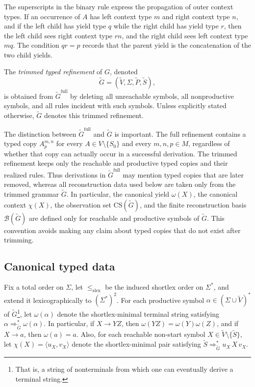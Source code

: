 \documentclass[11pt,a4paper]{article}
\newcommand{\CS}{\mathrm{CS}}
\begin{document}
The superscripts in the binary rule express the propagation of outer
context types. If an occurrence of $A$ has left context type $m$ and
right context type $n$, and if the left child has yield type $q$ while
the right child has yield type $r$, then the left child sees right
context type $rn$, and the right child sees left context type $mq$.
The condition $qr=p$ records that the parent yield is the concatenation
of the two child yields.

The \emph{trimmed typed refinement} of $G$, denoted
\[
  \widetilde G=(\widetilde V,\Sigma,\widetilde P,\widetilde S),
\]
is obtained from $\widetilde G^{\mathrm{full}}$ by deleting all
unreachable symbols, all nonproductive symbols, and all rules incident
with such symbols. Unless explicitly stated otherwise,
$\widetilde G$ denotes this trimmed refinement.

The distinction between
$\widetilde G^{\mathrm{full}}$ and $\widetilde G$ is important. The full
refinement contains a typed copy $A_p^{m,n}$ for every
$A\in V\setminus\{S_0\}$ and every $m,n,p\in M$, regardless of whether
that copy can actually occur in a successful derivation. The trimmed
refinement keeps only the reachable and productive typed copies and
their realized rules. Thus derivations in
$\widetilde G^{\mathrm{full}}$ may mention typed copies that are later
removed, whereas all reconstruction data used below are taken only from
the trimmed grammar $\widetilde G$. In particular, the canonical yield
$\omega(X)$, the canonical context $\chi(X)$, the observation set
$\CS(\widetilde G)$, and the finite reconstruction basis
$\mathcal B(\widetilde G)$ are defined only for reachable and productive
symbols of $\widetilde G$. This convention avoids making any claim about
typed copies that do not exist after trimming.

\subsection{Canonical typed data}

Fix a total order on $\Sigma$, let $\le_{\mathrm{slex}}$ be the induced
shortlex order on $\Sigma^*$, and extend it lexicographically to
$(\Sigma^*)^2$. For each productive symbol
$\alpha\in(\Sigma\cup\widetilde V)^*$ of $\widetilde G$\footnote{That
is, a string of nonterminals from which one can eventually derive a
terminal string.}, let $\omega(\alpha)$ denote the shortlex-minimal
terminal string satisfying
$\alpha\Rightarrow_{\widetilde G}^*\omega(\alpha)$. In particular, if
$X\to YZ$, then $\omega(YZ)=\omega(Y)\omega(Z)$, and if $X\to a$, then
$\omega(a)=a$. Also, for each reachable non-start symbol
$X\in\widetilde V\setminus\{\widetilde S\}$, let
$\chi(X)=\langle u_X,v_X\rangle$ denote the shortlex-minimal pair
satisfying $\widetilde S\Rightarrow_{\widetilde G}^* u_X\,X\,v_X$.
\end{document}

